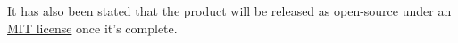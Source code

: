 \documentclass[11pt,pressrelease]{newlfm} %
\begin{document}
\begin{newlfm}
\begin{singlespace}
It has also been stated that the product will be released as open-source under an
\href{http://opensource.org/licenses/MIT}{MIT license} once it's complete.


\end{singlespace} %


\end{newlfm}
\end{document}
